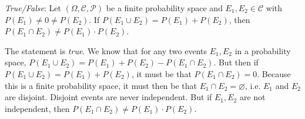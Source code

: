 \documentclass[11pt,letterpaper]{article}
\begin{document}
\quizsol \textit{True/False}: Let $(\Omega, \mathcal{C}, \mathcal{P})$ be a finite probability space and $E_1, E_2 \in \mathcal{C}$ with $P(E_1) \neq 0 \neq P(E_2)$. If $P(E_1 \cup E_2)= P(E_1) + P(E_2)$, then $P(E_1 \cap E_2) \neq P(E_1) \cdot P(E_2)$. \pspace

\sol The statement is \textit{true}. We know that for any two events $E_1, E_2$ in a probability space, $P(E_1 \cup E_2)= P(E_1) + P(E_2) - P(E_1 \cap E_2)$. But then if $P(E_1 \cup E_2)= P(E_1) + P(E_2)$, it must be that $P(E_1 \cap E_2)= 0$. Because this is a finite probability space, it must then be that $E_1 \cap E_2= \varnothing$, i.e. $E_1$ and $E_2$ are disjoint. Disjoint events are never independent. But if $E_1, E_2$ are not independent, then $P(E_1 \cap E_2) \neq P(E_1) \cdot P(E_2)$. 









\end{document}
